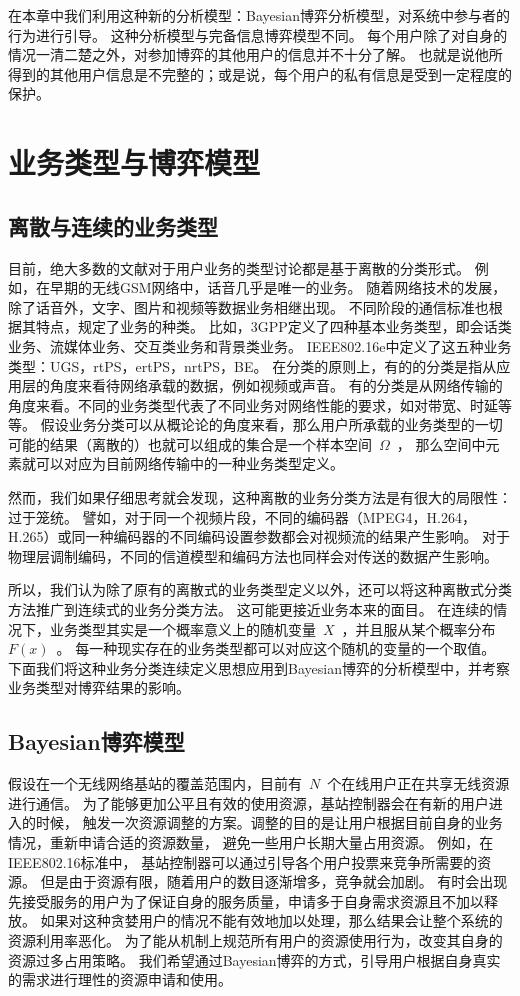 在本章中我们利用这种新的分析模型：Bayesian博弈分析模型，对系统中参与者的行为进行引导。
这种分析模型与完备信息博弈模型不同。
每个用户除了对自身的情况一清二楚之外，对参加博弈的其他用户的信息并不十分了解。
也就是说他所得到的其他用户信息是不完整的；或是说，每个用户的私有信息是受到一定程度的保护。

\section{业务类型与博弈模型}
\subsection{离散与连续的业务类型}
目前，绝大多数的文献对于用户业务的类型讨论都是基于离散的分类形式。
例如，在早期的无线GSM网络中，话音几乎是唯一的业务。
随着网络技术的发展，除了话音外，文字、图片和视频等数据业务相继出现。
不同阶段的通信标准也根据其特点，规定了业务的种类。
比如，3GPP定义了四种基本业务类型，即会话类业务、流媒体业务、交互类业务和背景类业务。
IEEE802.16e中定义了这五种业务类型：UGS，rtPS，ertPS，nrtPS，BE。
在分类的原则上，有的的分类是指从应用层的角度来看待网络承载的数据，例如视频或声音。
有的分类是从网络传输的角度来看。不同的业务类型代表了不同业务对网络性能的要求，如对带宽、时延等等。
假设业务分类可以从概论论的角度来看，那么用户所承载的业务类型的一切可能的结果（离散的）也就可以组成的集合是一个样本空间~$\Omega$~，
那么空间中元素就可以对应为目前网络传输中的一种业务类型定义。

然而，我们如果仔细思考就会发现，这种离散的业务分类方法是有很大的局限性：过于笼统。
譬如，对于同一个视频片段，不同的编码器（MPEG4，H.264，H.265）或同一种编码器的不同编码设置参数都会对视频流的结果产生影响。
对于物理层调制编码，不同的信道模型和编码方法也同样会对传送的数据产生影响。

所以，我们认为除了原有的离散式的业务类型定义以外，还可以将这种离散式分类方法推广到连续式的业务分类方法。
这可能更接近业务本来的面目。
在连续的情况下，业务类型其实是一个概率意义上的随机变量~$X$~，并且服从某个概率分布~$F(x)$~。
每一种现实存在的业务类型都可以对应这个随机的变量的一个取值。
下面我们将这种业务分类连续定义思想应用到Bayesian博弈的分析模型中，并考察业务类型对博弈结果的影响。

\subsection{Bayesian博弈模型}
假设在一个无线网络基站的覆盖范围内，目前有~$N$~个在线用户正在共享无线资源进行通信。
为了能够更加公平且有效的使用资源，基站控制器会在有新的用户进入的时候，
触发一次资源调整的方案。调整的目的是让用户根据目前自身的业务情况，重新申请合适的资源数量，
避免一些用户长期大量占用资源。
例如，在IEEE802.16标准中，
基站控制器可以通过引导各个用户投票来竞争所需要的资源。
但是由于资源有限，随着用户的数目逐渐增多，竞争就会加剧。
有时会出现先接受服务的用户为了保证自身的服务质量，申请多于自身需求资源且不加以释放。
如果对这种贪婪用户的情况不能有效地加以处理，那么结果会让整个系统的资源利用率恶化。
为了能从机制上规范所有用户的资源使用行为，改变其自身的资源过多占用策略。
我们希望通过Bayesian博弈的方式，引导用户根据自身真实的需求进行理性的资源申请和使用。

